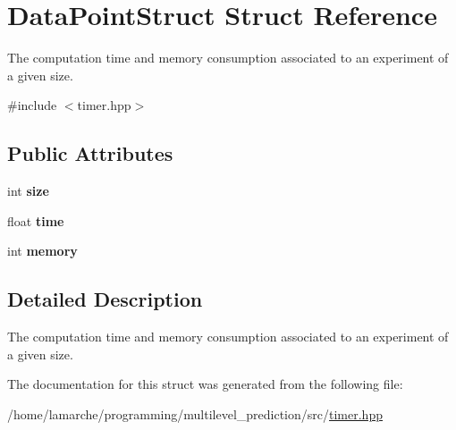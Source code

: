 \hypertarget{struct_data_point_struct}{\section{Data\-Point\-Struct Struct Reference}
\label{struct_data_point_struct}
}


The computation time and memory consumption associated to an experiment of a given size.  




{\ttfamily \#include $<$timer.\-hpp$>$}

\subsection*{Public Attributes}
\begin{DoxyCompactItemize}
\item 
\hypertarget{struct_data_point_struct_ac42ecde939c4bb686fbe3ce67d5c34e3}{int {\bfseries size}}\label{struct_data_point_struct_ac42ecde939c4bb686fbe3ce67d5c34e3}

\item 
\hypertarget{struct_data_point_struct_ae1dae54ff363ef8a6d946907b1621506}{float {\bfseries time}}\label{struct_data_point_struct_ae1dae54ff363ef8a6d946907b1621506}

\item 
\hypertarget{struct_data_point_struct_a6d345b8aa7e79cd06402446d73d19520}{int {\bfseries memory}}\label{struct_data_point_struct_a6d345b8aa7e79cd06402446d73d19520}

\end{DoxyCompactItemize}


\subsection{Detailed Description}
The computation time and memory consumption associated to an experiment of a given size. 

The documentation for this struct was generated from the following file\-:\begin{DoxyCompactItemize}
\item 
/home/lamarche/programming/multilevel\-\_\-prediction/src/\hyperlink{timer_8hpp}{timer.\-hpp}\end{DoxyCompactItemize}
